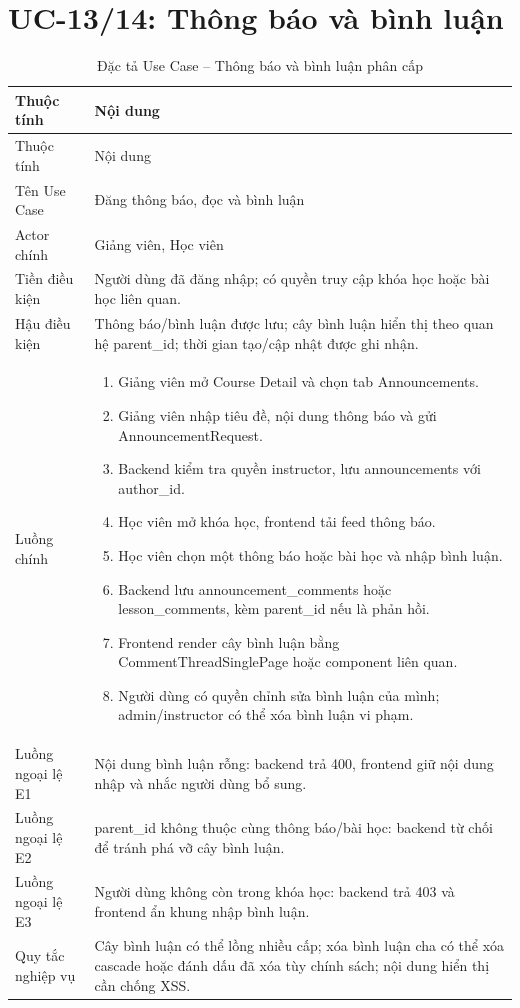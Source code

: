 \documentclass[12pt,a4paper]{report}
\begin{document}
\section{UC-13/14: Thông báo và bình luận}
\begin{longtable}{L{4cm} L{10.5cm}}
\caption{Đặc tả Use Case -- Thông báo và bình luận phân cấp}\label{tab:uc-comment}\\
\toprule
Thuộc tính & Nội dung \\
\midrule
\endfirsthead
\toprule
Thuộc tính & Nội dung \\
\midrule
\endhead
Tên Use Case & Đăng thông báo, đọc và bình luận \\
Actor chính & Giảng viên, Học viên \\
Tiền điều kiện & Người dùng đã đăng nhập; có quyền truy cập khóa học hoặc bài học liên quan. \\
Hậu điều kiện & Thông báo/bình luận được lưu; cây bình luận hiển thị theo quan hệ parent\_id; thời gian tạo/cập nhật được ghi nhận. \\
Luồng chính & \begin{enumerate}[leftmargin=*]
\item Giảng viên mở Course Detail và chọn tab Announcements.
\item Giảng viên nhập tiêu đề, nội dung thông báo và gửi AnnouncementRequest.
\item Backend kiểm tra quyền instructor, lưu announcements với author\_id.
\item Học viên mở khóa học, frontend tải feed thông báo.
\item Học viên chọn một thông báo hoặc bài học và nhập bình luận.
\item Backend lưu announcement\_comments hoặc lesson\_comments, kèm parent\_id nếu là phản hồi.
\item Frontend render cây bình luận bằng CommentThreadSinglePage hoặc component liên quan.
\item Người dùng có quyền chỉnh sửa bình luận của mình; admin/instructor có thể xóa bình luận vi phạm.
\end{enumerate} \\
Luồng ngoại lệ E1 & Nội dung bình luận rỗng: backend trả 400, frontend giữ nội dung nhập và nhắc người dùng bổ sung. \\
Luồng ngoại lệ E2 & parent\_id không thuộc cùng thông báo/bài học: backend từ chối để tránh phá vỡ cây bình luận. \\
Luồng ngoại lệ E3 & Người dùng không còn trong khóa học: backend trả 403 và frontend ẩn khung nhập bình luận. \\
Quy tắc nghiệp vụ & Cây bình luận có thể lồng nhiều cấp; xóa bình luận cha có thể xóa cascade hoặc đánh dấu đã xóa tùy chính sách; nội dung hiển thị cần chống XSS. \\
\bottomrule
\end{longtable}
\end{document}
